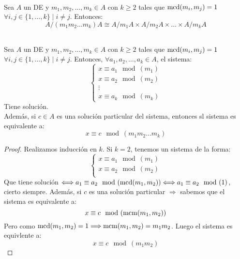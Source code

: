 \begin{teo}
    \ \\
    Sea $A$ un DE y $m_1, m_2, \ldots, m_k \in A$ con $k \geq 2$ tales que $\operatorname{mcd}(m_i, m_j)=1$\newline$\forall i,j \in \{1, \ldots, k\} \mid
        i\neq j$. Entonces:
    $$A/(m_1m_2\ldots m_k)A \cong A/m_1A \times A/m_2A \times \ldots \times A/m_kA$$
\end{teo}

\begin{lema}
    \ \\
    Sea $A$ un DE y $m_1, m_2, \ldots, m_k \in A$ con $k \geq 2$ tales que $\operatorname{mcd}(m_i, m_j)=1$\newline$\forall i,j \in \{1, \ldots, k\} \mid
        i\neq j$. Entonces, $\forall a_1, a_2, \ldots, a_k \in A$, el sistema:
    $$\left\{ \begin{array}{l}
            x\equiv a_1\mod(m_1) \\
            x\equiv a_2\mod(m_2) \\
            \vdots               \\
            x\equiv a_k\mod(m_k)
        \end{array} \right.$$
    Tiene solución.\\

    
    Además, si $c \in A$ es una solución particular del sistema, entonces sl sistema es equivalente a:
    $$x\equiv c\mod(m_1m_2\ldots m_k)$$
\begin{proof}
    Realizamos inducción en $k$.\newline
    Si $k = 2$, tenemos un sistema de la forma:
    $$\left\{ \begin{array}{l}
            x\equiv a_1\mod(m_1) \\
            x\equiv a_2\mod(m_2) \\
        \end{array} \right.$$
    Que tiene solución $\Longleftrightarrow a_1\equiv a_2\mod(\operatorname{mcd}(m_1,m_2)) \Longleftrightarrow a_1\equiv a_2\mod(1)$, cierto siempre.\newline
    Además, si $c$ es una solución particular $\Longrightarrow$ sabemos que el sistema es equivalente a:
    $$x\equiv c\mod(\operatorname{mcm}(m_1,m_2))$$
    Pero como $\operatorname{mcd}(m_1,m_2)=1 \Longrightarrow \operatorname{mcm}(m_1,m_2) = m_1m_2$. Luego el sistema es equivlente a:
    $$x\equiv c\mod(m_1m_2)$$


\end{proof}
\end{lema}

